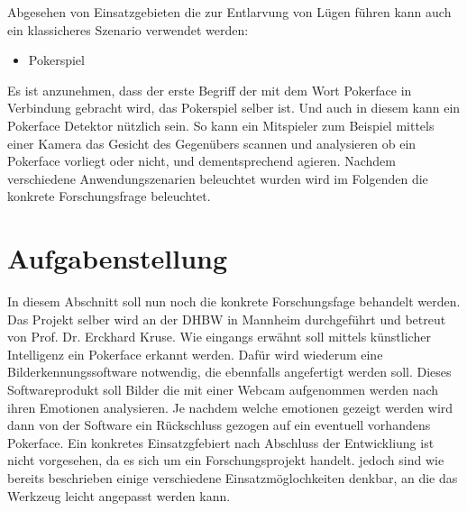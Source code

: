 \documentclass[12pt, a4paper]{scrbook}
\begin{document}
Abgesehen von Einsatzgebieten die zur Entlarvung von Lügen führen kann auch ein klassicheres Szenario verwendet werden:
\begin{itemize}
	\item{Pokerspiel}
\end{itemize}
Es ist anzunehmen, dass der erste Begriff der mit dem Wort Pokerface in Verbindung gebracht wird, das Pokerspiel selber ist. Und auch in diesem kann ein Pokerface Detektor nützlich sein. So kann ein Mitspieler zum Beispiel mittels einer Kamera das Gesicht des Gegenübers scannen und analysieren ob ein Pokerface vorliegt oder nicht, und dementsprechend agieren.
Nachdem verschiedene Anwendungszenarien beleuchtet wurden wird im Folgenden die konkrete Forschungsfrage beleuchtet.
\section{Aufgabenstellung}
In diesem Abschnitt soll nun noch die konkrete Forschungsfage behandelt werden. Das Projekt selber wird an der DHBW in Mannheim durchgeführt und betreut von Prof. Dr. Erckhard Kruse.
\newline
 Wie eingangs erwähnt soll mittels künstlicher Intelligenz ein Pokerface erkannt werden. Dafür wird wiederum eine Bilderkennungssoftware notwendig, die ebennfalls angefertigt werden soll. Dieses Softwareprodukt soll Bilder%
die mit einer Webcam aufgenommen werden nach ihren Emotionen analysieren. Je nachdem welche emotionen gezeigt werden wird dann von der Software ein Rückschluss gezogen auf ein eventuell vorhandens Pokerface. Ein konkretes Einsatzgfebiert nach Abschluss der Entwickliung ist nicht vorgesehen, da es sich um ein Forschungsprojekt handelt. jedoch sind wie bereits beschrieben einige verschiedene Einsatzmöglochkeiten denkbar, an die das Werkzeug leicht angepasst werden kann. 



\let\cleardoublepage\relax
\end{document}
